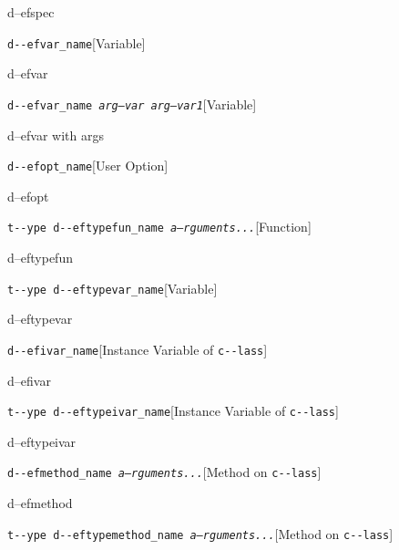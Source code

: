 \documentclass{book}
\begin{document}
%
d--efspec

\noindent\texttt{d{-}{-}efvar\_name}\hfill[Variable]



%
d--efvar

\noindent\texttt{d{-}{-}efvar\_name \bgroup{}\normalfont{}\textsl{arg--var arg--var1}\egroup{}}\hfill[Variable]



%
d--efvar with args

\noindent\texttt{d{-}{-}efopt\_name}\hfill[User Option]



%
d--efopt

\noindent\texttt{t{-}{-}ype d{-}{-}eftypefun\_name \bgroup{}\normalfont{}\textsl{a--rguments...}\egroup{}}\hfill[Function]



%
d--eftypefun

\noindent\texttt{t{-}{-}ype d{-}{-}eftypevar\_name}\hfill[Variable]



%
d--eftypevar

\noindent\texttt{d{-}{-}efivar\_name}\hfill[Instance Variable of \texttt{c{-}{-}lass}]



%
d--efivar

\noindent\texttt{t{-}{-}ype d{-}{-}eftypeivar\_name}\hfill[Instance Variable of \texttt{c{-}{-}lass}]



%
d--eftypeivar

\noindent\texttt{d{-}{-}efmethod\_name \bgroup{}\normalfont{}\textsl{a--rguments...}\egroup{}}\hfill[Method on \texttt{c{-}{-}lass}]



%
d--efmethod

\noindent\texttt{t{-}{-}ype d{-}{-}eftypemethod\_name \bgroup{}\normalfont{}\textsl{a--rguments...}\egroup{}}\hfill[Method on \texttt{c{-}{-}lass}]
\end{document}
